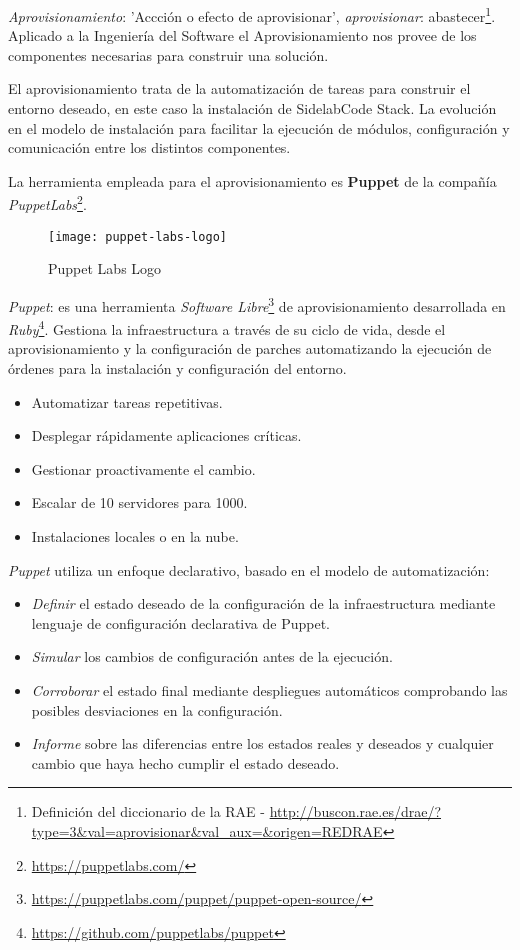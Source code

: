 \par \emph{Aprovisionamiento}: 'Accción o efecto de aprovisionar', \emph{aprovisionar}: abastecer\footnote{Definición del diccionario de la RAE - \url{http://buscon.rae.es/drae/?type=3&val=aprovisionar&val_aux=&origen=REDRAE}}. Aplicado a la Ingeniería del Software el Aprovisionamiento nos provee de los componentes necesarias para construir una solución.

\par El aprovisionamiento trata de la automatización de tareas para construir el entorno deseado, en este caso la instalación de SidelabCode Stack. La evolución en el modelo de instalación para facilitar la ejecución de módulos, configuración y comunicación entre los distintos componentes.

\par La herramienta empleada para el aprovisionamiento es \textbf{Puppet} de la compañía \emph{PuppetLabs}\footnote{\url{https://puppetlabs.com/}}.

\begin{figure}[H]
    \centering
    \texttt{[image: puppet-labs-logo]}
    \caption{Puppet Labs Logo}
    \label{fig:puppet-labs}
\end{figure}

\par \emph{Puppet}: es una herramienta \emph{Software Libre}\footnote{\url{https://puppetlabs.com/puppet/puppet-open-source/}} de aprovisionamiento desarrollada en \emph{Ruby}\footnote{\url{https://github.com/puppetlabs/puppet}}. Gestiona la infraestructura a través de su ciclo de vida, desde el aprovisionamiento y la configuración de parches automatizando la ejecución de órdenes para la instalación y configuración del entorno.

\begin{itemize}
	\item Automatizar tareas repetitivas.
	\item Desplegar rápidamente aplicaciones críticas.
	\item Gestionar proactivamente el cambio.
	\item Escalar de 10 servidores para 1000.
	\item Instalaciones locales o en la nube.
\end{itemize}

\par \emph{Puppet} utiliza un enfoque declarativo, basado en el modelo de automatización:
\begin{itemize}
	\item \emph{Definir} el estado deseado de la configuración de la infraestructura mediante lenguaje de configuración declarativa de Puppet.
	\item \emph{Simular} los cambios de configuración antes de la ejecución.
	\item \emph{Corroborar} el estado final mediante despliegues automáticos comprobando las posibles desviaciones en la configuración.
	\item \emph{Informe} sobre las diferencias entre los estados reales y deseados y cualquier cambio que haya hecho cumplir el estado deseado.
\end{itemize}

